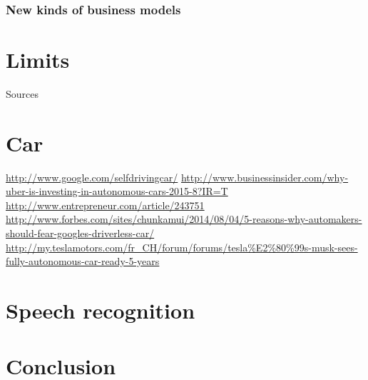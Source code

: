 \documentclass[12pt]{article}
\begin{document}
\subsubsection{New kinds of business models}



\pagebreak


\section{Limits}




Sources

\section{Car}

\url{http://www.google.com/selfdrivingcar/}
\url{http://www.businessinsider.com/why-uber-is-investing-in-autonomous-cars-2015-8?IR=T}
\url{http://www.entrepreneur.com/article/243751}
\url{http://www.forbes.com/sites/chunkamui/2014/08/04/5-reasons-why-automakers-should-fear-googles-driverless-car/}
\url{http://my.teslamotors.com/fr_CH/forum/forums/tesla%E2%80%99s-musk-sees-fully-autonomous-car-ready-5-years}

\section{Speech recognition}


\pagebreak


\section*{Conclusion}\label{conclusion}

\pagebreak


\end{document}
